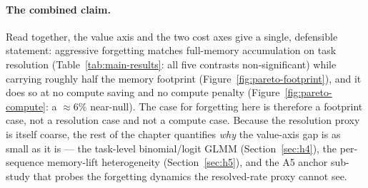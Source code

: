 \paragraph{The combined claim.}
Read together, the value axis and the two cost axes give a single, defensible statement:
aggressive forgetting matches full-memory accumulation on task resolution
(Table~\ref{tab:main-results}: all five contrasts non-significant) while carrying roughly
half the memory footprint (Figure~\ref{fig:pareto-footprint}), and it does so at no compute
saving and no compute penalty (Figure~\ref{fig:pareto-compute}: a $\approx 6\%$ near-null).
The case for forgetting here is therefore a footprint case, not a resolution case and not a
compute case. Because the resolution proxy is itself coarse, the rest of the chapter
quantifies \emph{why} the value-axis gap is as small as it is --- the task-level
binomial/logit GLMM (Section~\ref{sec:h4}), the per-sequence memory-lift heterogeneity
(Section~\ref{sec:h5}), and the A5 anchor sub-study that probes the forgetting dynamics the
resolved-rate proxy cannot see.
